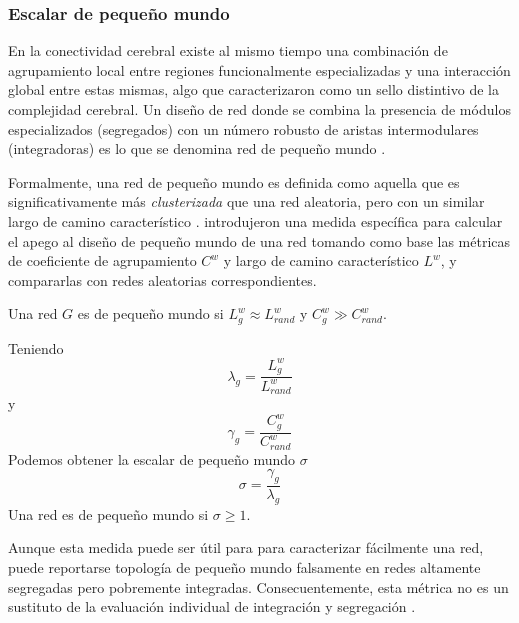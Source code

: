 \subsubsection{Escalar de pequeño mundo}
En la conectividad cerebral existe al mismo tiempo una combinación de agrupamiento local entre regiones funcionalmente especializadas y una interacción global entre estas mismas, algo que \textcite{Tononi1994} caracterizaron como un sello distintivo de la complejidad cerebral.
Un diseño de red donde se combina la presencia de módulos especializados (segregados) con un número robusto de aristas intermodulares (integradoras) es lo que se denomina red de pequeño mundo \parencite{Rubinov2010}. \par
Formalmente, una red de pequeño mundo es definida como aquella que es significativamente más \textit{clusterizada} que una red aleatoria, pero con un similar largo de camino característico \parencite{Watts1998}.
\textcite{Humphries2008} introdujeron una medida específica para calcular el apego al diseño de pequeño mundo de una red tomando como base las métricas de coeficiente de agrupamiento $C^w$ y largo de camino característico $L^w$, y compararlas con redes aleatorias correspondientes.\par
Una red $G$ es de pequeño mundo si $L_g^w \approx L_{rand}^w$ y $C_g^w \gg C_{rand}^w$. \par
Teniendo
\begin{equation}\label{eqLambda}
    \lambda_g=\frac{L_g^w}{L_{rand}^w}
\end{equation}
y
\begin{equation}\label{eqGamma}
    \gamma_g=\frac{C_g^w}{C_{rand}^w}
\end{equation}
Podemos obtener la escalar de pequeño mundo $\sigma$
\begin{equation}\label{eqSW}
    \sigma=\frac{\gamma_g}{\lambda_g}
\end{equation}
Una red es de pequeño mundo si $\sigma \geq 1$.\par
Aunque esta medida puede ser útil para para caracterizar fácilmente una red, puede reportarse topología de pequeño mundo falsamente en redes altamente segregadas pero pobremente integradas.
Consecuentemente, esta métrica no es un sustituto de la evaluación individual de integración y segregación \parencite{Rubinov2010}.

